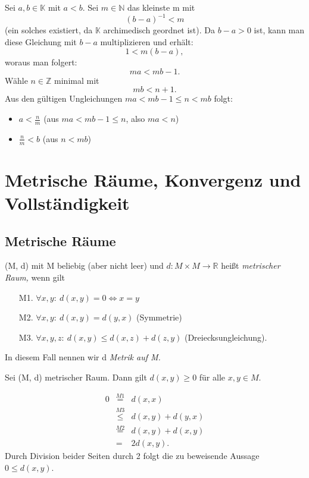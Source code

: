 \documentclass[10pt]{scrbook}
\begin{document}
\begin{bew}
Sei $a, b\in \mathbb{K}$ mit $a<b$. Sei $m\in\mathbb{N}$ das kleinste m mit
\begin{displaymath}
	(b-a)^{-1}<m
\end{displaymath}
(ein solches existiert, da $\mathbb{K}$ archimedisch geordnet ist). Da $b-a>0$ ist, kann man diese Gleichung mit $b-a$ multiplizieren und erhält:
\begin{displaymath}
	1<m (b-a),
\end{displaymath}
woraus man folgert:
\begin{displaymath}
	m a < m b-1.
\end{displaymath}
Wähle $n\in \mathbb{Z}$ minimal mit
\begin{displaymath}
	m b<n+1.
\end{displaymath}
Aus den gültigen Ungleichungen $m a< m b-1\leq n<m b$ folgt:

\begin{itemize}
	\item $a < \frac{n}{m}$ (aus $m a< m b-1\leq n$, also $m a< n$)
	\item $\frac{n}{m} < b$ (aus $n<m b$)
\end{itemize}
\end{bew}

\section{Metrische Räume, Konvergenz und Vollständigkeit}

\subsection{Metrische Räume}

\begin{Def}
(M, d) mit M beliebig (aber nicht leer) und $d: M\times M\rightarrow \mathbb{R}$ heißt \emph{metrischer Raum,} wenn gilt
\begin{enumerate}
	\item[M1.] $\forall x, y:\ d(x, y)=0 \Leftrightarrow x=y$
	\item[M2.] $\forall x, y:\ d(x, y)=d(y, x)$ (Symmetrie)
	\item[M3.] $\forall x, y, z:\ d(x, y)\leq d(x, z)+d(z, y)$ (Dreiecksungleichung).
\end{enumerate}
In diesem Fall nennen wir d \emph{Metrik auf M.}
\end{Def}

\begin{Le}
Sei (M, d) metrischer Raum. Dann gilt $d(x, y)\geq 0$ für alle $x, y\in M$.
\end{Le}
\begin{bew}
\begin{eqnarray*}
0 & \stackrel{M1}{=} & d(x, x) \\
& \stackrel{M3}{\leq} & d(x, y)+d(y, x) \\
& \stackrel{M2}{=} & d(x, y)+d(x, y) \\
& = & 2 d(x, y).
\end{eqnarray*}
Durch Division beider Seiten durch 2 folgt die zu beweisende Aussage $0\leq d(x, y)$.
\end{bew}
\end{document}
